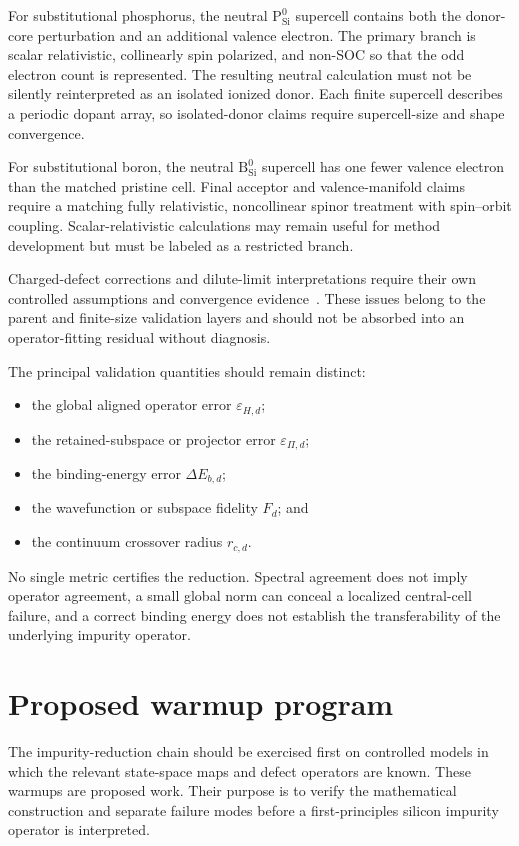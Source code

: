For substitutional phosphorus, the neutral $\mathrm P_{\mathrm{Si}}^0$
supercell contains both the donor-core perturbation and an additional valence
electron. The primary branch is scalar relativistic, collinearly spin
polarized, and non-SOC so that the odd electron count is represented. The
resulting neutral calculation must not be silently reinterpreted
as an isolated ionized donor. Each finite supercell describes a periodic dopant
array, so isolated-donor claims require supercell-size and shape convergence.

For substitutional boron, the neutral $\mathrm B_{\mathrm{Si}}^0$ supercell has
one fewer valence electron than the matched pristine cell. Final acceptor and
valence-manifold claims require a matching fully relativistic, noncollinear
spinor treatment with spin--orbit coupling. Scalar-relativistic calculations
may remain useful for method development but
must be labeled as a restricted branch.

Charged-defect corrections and dilute-limit interpretations require their own
controlled assumptions and convergence evidence~\cite{freysoldt2009,freysoldt2014}.
These issues belong to the parent and finite-size validation layers and should
not be absorbed into an operator-fitting residual without diagnosis.

The principal validation quantities should remain distinct:
\begin{itemize}
    \item the global aligned operator error $\varepsilon_{H,d}$;
    \item the retained-subspace or projector error $\varepsilon_{\Pi,d}$;
    \item the binding-energy error $\Delta E_{b,d}$;
    \item the wavefunction or subspace fidelity $F_d$; and
    \item the continuum crossover radius $r_{c,d}$.
\end{itemize}
No single metric certifies the reduction. Spectral agreement does not imply
operator agreement, a small global norm can conceal a localized central-cell
failure, and a correct binding energy does not establish the transferability of
the underlying impurity operator.

\section*{Proposed warmup program}

The impurity-reduction chain should be exercised first on controlled models in
which the relevant state-space maps and defect operators are known. These
warmups are proposed work. Their purpose is to verify the mathematical
construction and separate failure modes before a first-principles silicon
impurity operator is interpreted.


